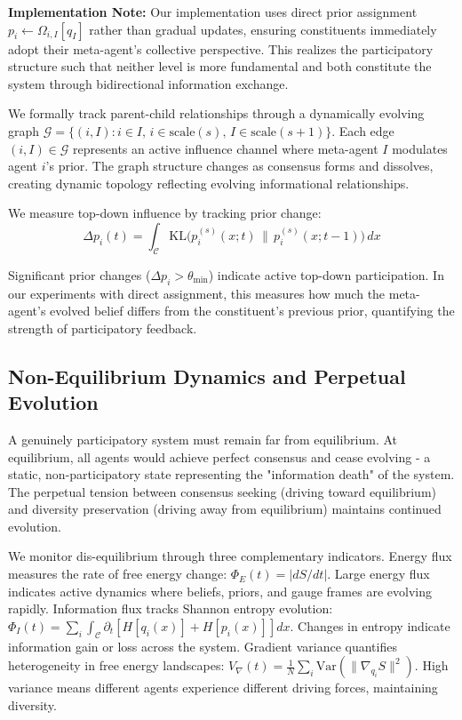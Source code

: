 \documentclass[11pt]{article}
\begin{document}
\textbf{Implementation Note:} Our implementation uses direct prior assignment $p_i \leftarrow \Omega_{i,I}[q_I]$ rather than gradual updates, ensuring constituents immediately adopt their meta-agent's collective perspective. This realizes the participatory structure such that neither level is more fundamental and both constitute the system through bidirectional information exchange.

We formally track parent-child relationships through a dynamically evolving graph $\mathcal{G} = \{(i, I) : i \in I, \, i \in \text{scale}(s), \, I \in \text{scale}(s+1)\}$. Each edge $(i, I) \in \mathcal{G}$ represents an active influence channel where meta-agent $I$ modulates agent $i$'s prior. The graph structure changes as consensus forms and dissolves, creating dynamic topology reflecting evolving informational relationships.

We measure top-down influence by tracking prior change:
\begin{equation}
\Delta p_i(t) = \int_{\mathcal{C}} \mathrm{KL}\big(p_i^{(s)}(x; t) \,\|\, p_i^{(s)}(x; t-1)\big) \, dx
\end{equation}

Significant prior changes ($\Delta p_i > \theta_{\min}$) indicate active top-down participation. In our experiments with direct assignment, this measures how much the meta-agent's evolved belief differs from the constituent's previous prior, quantifying the strength of participatory feedback.

\subsection{Non-Equilibrium Dynamics and Perpetual Evolution}

A genuinely participatory system must remain far from equilibrium. At equilibrium, all agents would achieve perfect consensus and cease evolving - a static, non-participatory state representing the "information death" of the system. The perpetual tension between consensus seeking (driving toward equilibrium) and diversity preservation (driving away from equilibrium) maintains continued evolution.

We monitor dis-equilibrium through three complementary indicators. Energy flux measures the rate of free energy change: $\Phi_E(t) = |dS/dt|$. Large energy flux indicates active dynamics where beliefs, priors, and gauge frames are evolving rapidly. Information flux tracks Shannon entropy evolution: $\Phi_I(t) = \sum_i \int_{\mathcal{C}} \partial_t[H[q_i(x)] + H[p_i(x)]] dx$. Changes in entropy indicate information gain or loss across the system. Gradient variance quantifies heterogeneity in free energy landscapes: $V_{\nabla}(t) = \frac{1}{N}\sum_i \mathrm{Var}(\|\nabla_{q_i} S\|^2)$. High variance means different agents experience different driving forces, maintaining diversity.
\end{document}
